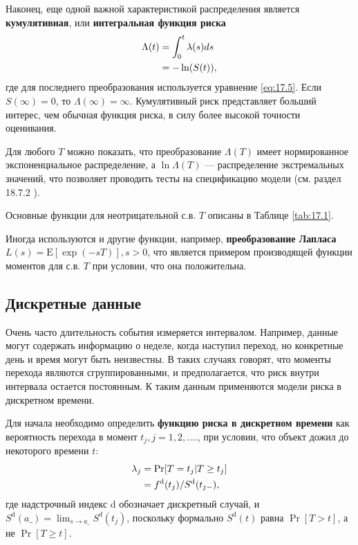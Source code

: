 Наконец, еще одной важной характеристикой распределения является \textbf{кумулятивная}, или \textbf{интегральная функция риска}
    \begin{align}
    \label{eq:17.6}
    \Lambda(t) &= \int^{t}_{0} \lambda(s)ds \\
    &= - \ln(S(t)), \notag
    \end{align}
где для последнего преобразования используется уравнение \ref{eq:17.5}. Если $S(\infty)=0$, то $\Lambda(\infty)=\infty$. Кумулятивный риск представляет больший интерес, чем обычная функция риска, в силу более высокой точности оценивания.

Для любого $T$ можно показать, что преобразование $\Lambda(T)$ имеет нормированное экспоненциальное распределение, а $\ln\Lambda(T)$ --- распределение экстремальных значений, что позволяет проводить тесты на спецификацию модели (см. раздел 18.7.2
).

Основные функции для неотрицательной с.в. $T$ описаны в Таблице \ref{tab:17.1}.

Иногда используются и другие функции, например, \textbf{преобразование Лапласа} $L(s)=\mathrm{E}[\exp{(-sT)}], s>0$, что является примером производящей функции моментов для с.в. $T$ при условии, что она положительна.


\subsection{Дискретные данные}\label{sec:17.3.2}

\noindent
Очень часто длительность события измеряется интервалом. Например, данные могут содержать информацию о неделе, когда наступил переход, но конкретные день и время могут быть неизвестны. В таких случаях говорят, что моменты перехода являются сгруппированными, и предполагается, что риск внутри интервала остается постоянным. К таким данным применяются модели риска в дискретном времени.

Для начала необходимо определить \textbf{функцию риска в дискретном времени} как вероятность перехода в момент $t_j,j=1,2,....$, при условии, что объект дожил до некоторого времени $t$:
    \begin{align}
    \label{eq:17.7}
    \lambda_j &= \Pr[T = t_j|T \ge t_j]\\
    &= f^{\mathrm{d}} (t_j)/S^{\mathrm{d}}(t_{j-}), \notag
    \end{align}
где надстрочный индекс d обозначает дискретный случай, и $S^\mathrm{d}(a\_)=\lim_{s\rightarrow a\_}{S^d(t_j)}$, поскольку формально $S^\mathrm{d}(t)$ равна $\Pr{[T>t]}$, а не $\Pr{[T\ge t]}$.

